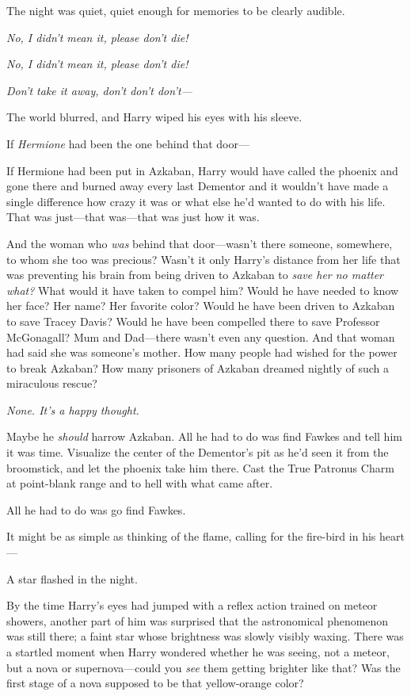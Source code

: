 The night was quiet, quiet enough for memories to be clearly audible.

\emph{No, I didn't mean it, please don't die!}

\emph{No, I didn't mean it, please don't die!}

\emph{Don't take it away, don't don't don't—}

The world blurred, and Harry wiped his eyes with his sleeve.

If \emph{Hermione} had been the one behind that door—

If Hermione had been put in Azkaban, Harry would have called the phoenix and
gone there and burned away every last Dementor and it wouldn't have made a
single difference how crazy it was or what else he'd wanted to do with his
life. That was just—that was—that was just how it was.

And the woman who \emph{was} behind that door—wasn't there someone,
somewhere, to whom she too was precious? Wasn't it only Harry's distance from
her life that was preventing his brain from being driven to Azkaban to
\emph{save her no matter what?} What would it have taken to compel him? Would
he have needed to know her face? Her name? Her favorite color? Would he have
been driven to Azkaban to save Tracey Davis? Would he have been compelled there
to save Professor McGonagall? Mum and Dad—there wasn't even any question. And
that woman had said she was someone's mother. How many people had wished for
the power to break Azkaban? How many prisoners of Azkaban dreamed nightly of
such a miraculous rescue?

\emph{None. It's a happy thought.}

Maybe he \emph{should} harrow Azkaban. All he had to do was find Fawkes and
tell him it was time. Visualize the center of the Dementor's pit as he'd seen
it from the broomstick, and let the phoenix take him there. Cast the True
Patronus Charm at point-blank range and to hell with what came after.

All he had to do was go find Fawkes.

It might be as simple as thinking of the flame, calling for the fire-bird in
his heart—

A star flashed in the night.

By the time Harry's eyes had jumped with a reflex action trained on meteor
showers, another part of him was surprised that the astronomical phenomenon was
still there; a faint star whose brightness was slowly visibly waxing. There was
a startled moment when Harry wondered whether he was seeing, not a meteor, but
a nova or supernova—could you \emph{see} them getting brighter like that? Was
the first stage of a nova supposed to be that yellow-orange color?

